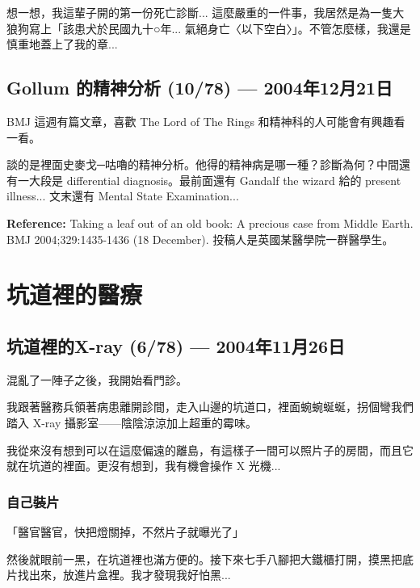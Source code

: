 \documentclass[12pt,a4paper]{article}
\newenvironment{myquote}{%
    \begin{tcolorbox}[
        colback=quote_bg,
        colframe=emergency_gray,
        boxrule=0pt,
        leftrule=3pt,
        arc=0pt,
        left=10pt,
        right=10pt,
        top=8pt,
        bottom=8pt
    ]
    \itshape
}{%
    \end{tcolorbox}
}
\begin{document}
\begin{myquote}
想一想，我這輩子開的第一份死亡診斷... 這麼嚴重的一件事，我居然是為一隻大狼狗寫上「該患犬於民國九十○年... 氣絕身亡〈以下空白〉」。不管怎麼樣，我還是慎重地蓋上了我的章...
\end{myquote}

\subsection{Gollum 的精神分析 (10/78) — 2004年12月21日}

BMJ 這週有篇文章，喜歡 The Lord of The Rings 和精神科的人可能會有興趣看一看。

談的是裡面史麥戈─咕嚕的精神分析。他得的精神病是哪一種？診斷為何？中間還有一大段是 differential diagnosis。最前面還有 Gandalf the wizard 給的 present illness... 文末還有 Mental State Examination...

\textbf{Reference:} Taking a leaf out of an old book: A precious case from Middle Earth. BMJ 2004;329:1435-1436 (18 December). 投稿人是英國某醫學院一群醫學生。

\section{坑道裡的醫療}

\subsection{坑道裡的X-ray (6/78) — 2004年11月26日}

混亂了一陣子之後，我開始看門診。

我跟著醫務兵領著病患離開診間，走入山邊的坑道口，裡面蜿蜿蜒蜒，拐個彎我們踏入 X-ray 攝影室——陰陰涼涼加上超重的霉味。

我從來沒有想到可以在這麼偏遠的離島，有這樣子一間可以照片子的房間，而且它就在坑道的裡面。更沒有想到，我有機會操作 X 光機...

\subsubsection{自己裝片}

\begin{myquote}
「醫官醫官，快把燈關掉，不然片子就曝光了」
\end{myquote}

然後就眼前一黑，在坑道裡也滿方便的。接下來七手八腳把大鐵櫃打開，摸黑把底片找出來，放進片盒裡。我才發現我好怕黑...
\end{document}
